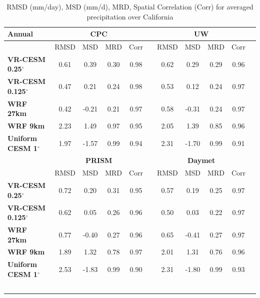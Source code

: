 \begin{table}
\begin{center}
\caption{RMSD (mm/day), MSD (mm/d), MRD, Spatial Correlation (Corr) for averaged precipitation over California} \label{tab:stat_Pr}
\begin{tabular*}{6.5in}{l @{\extracolsep{\fill}}cccccccccc}
\hline \textbf{Annual} & \multicolumn{4}{c}{\textbf{CPC}}  & & \multicolumn{4}{c}{\textbf{UW}} \\
\hline $    $ & RMSD & MSD & MRD & Corr & & RMSD & MSD & MRD & Corr \\
\hline \textbf{VR-CESM 0.25$^\circ$} & 0.61 & 0.39 & 0.30 & 0.98 & & 0.62 & 0.29 & 0.29 & 0.96 \\
\textbf{VR-CESM 0.125$^\circ$} & 0.47 & 0.21 & 0.24 & 0.98 & & 0.53 & 0.12 & 0.24 & 0.97 \\
\textbf{WRF 27km} & 0.42 & -0.21 & 0.21 & 0.97 & & 0.58 & -0.31 & 0.24 & 0.97 \\
\textbf{WRF 9km} & 2.23 & 1.49 & 0.97 & 0.95 & & 2.05 & 1.39 & 0.85 & 0.96 \\
\textbf{Uniform CESM 1$^\circ$} & 1.97 & -1.57 & 0.99 & 0.94 & & 2.31 & -1.70 & 0.99 & 0.91 \\
\hline & \multicolumn{4}{c}{\textbf{PRISM}} & & \multicolumn{4}{c}{\textbf{Daymet}} \\
\hline $    $ & RMSD & MSD & MRD & Corr & & RMSD & MSD & MRD & Corr \\
\hline \textbf{VR-CESM 0.25$^\circ$} & 0.72 & 0.20 & 0.31 & 0.95 & & 0.57 & 0.19 & 0.25 & 0.97 \\
\textbf{VR-CESM 0.125$^\circ$} & 0.62 & 0.05 & 0.26 & 0.96 & & 0.50 & 0.03 & 0.22 & 0.97 \\
\textbf{WRF 27km} & 0.77 & -0.40 & 0.27 & 0.96 & & 0.65 & -0.41 & 0.27 & 0.97 \\
\textbf{WRF 9km} & 1.89 & 1.32 & 0.78 & 0.97 & & 2.01 & 1.31 & 0.76 & 0.96 \\
\textbf{Uniform CESM 1$^\circ$} & 2.53 & -1.83 & 0.99 & 0.90 & & 2.31 & -1.80 & 0.99 & 0.93 \\
\hline
\
\end{tabular*}


\end{center}
\end{table}
